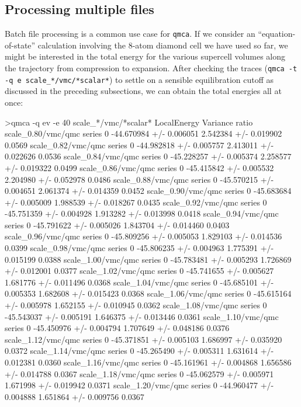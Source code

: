 \subsection{Processing multiple files}
\label{sec:qmca_multiple_files}
Batch file processing is a common use case for \texttt{qmca}. 
If we consider an ``equation-of-state'' calculation involving 
the 8-atom diamond cell we have used so far, we might be interested 
in the total energy for the various supercell volumes along the 
trajectory from compression to expansion.  After checking 
the traces (\texttt{qmca -t -q e scale\_*/vmc/*scalar*}) 
to settle on a sensible equilibration cutoff as discussed in 
the preceding subsections, we can obtain the total energies 
all at once:
\begin{shade}
>qmca -q ev -e 40 scale_*/vmc/*scalar*
                            LocalEnergy               Variance           ratio 
scale_0.80/vmc/qmc  series 0 -44.670984 +/- 0.006051  2.542384 +/- 0.019902  0.0569 
scale_0.82/vmc/qmc  series 0 -44.982818 +/- 0.005757  2.413011 +/- 0.022626  0.0536 
scale_0.84/vmc/qmc  series 0 -45.228257 +/- 0.005374  2.258577 +/- 0.019322  0.0499 
scale_0.86/vmc/qmc  series 0 -45.415842 +/- 0.005532  2.204980 +/- 0.052978  0.0486 
scale_0.88/vmc/qmc  series 0 -45.570215 +/- 0.004651  2.061374 +/- 0.014359  0.0452 
scale_0.90/vmc/qmc  series 0 -45.683684 +/- 0.005009  1.988539 +/- 0.018267  0.0435 
scale_0.92/vmc/qmc  series 0 -45.751359 +/- 0.004928  1.913282 +/- 0.013998  0.0418 
scale_0.94/vmc/qmc  series 0 -45.791622 +/- 0.005026  1.843704 +/- 0.014460  0.0403 
scale_0.96/vmc/qmc  series 0 -45.809256 +/- 0.005053  1.829103 +/- 0.014536  0.0399 
scale_0.98/vmc/qmc  series 0 -45.806235 +/- 0.004963  1.775391 +/- 0.015199  0.0388 
scale_1.00/vmc/qmc  series 0 -45.783481 +/- 0.005293  1.726869 +/- 0.012001  0.0377 
scale_1.02/vmc/qmc  series 0 -45.741655 +/- 0.005627  1.681776 +/- 0.011496  0.0368 
scale_1.04/vmc/qmc  series 0 -45.685101 +/- 0.005353  1.682608 +/- 0.015423  0.0368 
scale_1.06/vmc/qmc  series 0 -45.615164 +/- 0.005978  1.652155 +/- 0.010945  0.0362 
scale_1.08/vmc/qmc  series 0 -45.543037 +/- 0.005191  1.646375 +/- 0.013446  0.0361 
scale_1.10/vmc/qmc  series 0 -45.450976 +/- 0.004794  1.707649 +/- 0.048186  0.0376 
scale_1.12/vmc/qmc  series 0 -45.371851 +/- 0.005103  1.686997 +/- 0.035920  0.0372 
scale_1.14/vmc/qmc  series 0 -45.265490 +/- 0.005311  1.631614 +/- 0.012381  0.0360 
scale_1.16/vmc/qmc  series 0 -45.161961 +/- 0.004868  1.656586 +/- 0.014788  0.0367 
scale_1.18/vmc/qmc  series 0 -45.062579 +/- 0.005971  1.671998 +/- 0.019942  0.0371 
scale_1.20/vmc/qmc  series 0 -44.960477 +/- 0.004888  1.651864 +/- 0.009756  0.0367 
\end{shade}
\noindent

